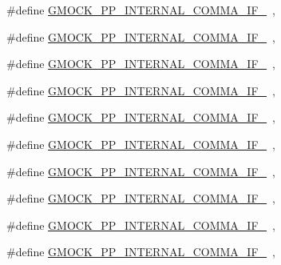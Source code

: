 \begin{DoxyCompactItemize}
\item 
\#define \mbox{\hyperlink{googletest-master_2googlemock_2include_2gmock_2internal_2gmock-pp_8h_a7b531142e60aa3411e6b11c598ee53bf}{G\+M\+O\+C\+K\+\_\+\+P\+P\+\_\+\+I\+N\+T\+E\+R\+N\+A\+L\+\_\+\+C\+O\+M\+M\+A\+\_\+\+I\+F\+\_}}~,
\item 
\#define \mbox{\hyperlink{googletest-master_2googlemock_2include_2gmock_2internal_2gmock-pp_8h_a7f13063361c7eb6017ca649c0efdeec1}{G\+M\+O\+C\+K\+\_\+\+P\+P\+\_\+\+I\+N\+T\+E\+R\+N\+A\+L\+\_\+\+C\+O\+M\+M\+A\+\_\+\+I\+F\+\_}}~,
\item 
\#define \mbox{\hyperlink{googletest-master_2googlemock_2include_2gmock_2internal_2gmock-pp_8h_a3471d8cc6b174ee5440868cb37633aaa}{G\+M\+O\+C\+K\+\_\+\+P\+P\+\_\+\+I\+N\+T\+E\+R\+N\+A\+L\+\_\+\+C\+O\+M\+M\+A\+\_\+\+I\+F\+\_}}~,
\item 
\#define \mbox{\hyperlink{googletest-master_2googlemock_2include_2gmock_2internal_2gmock-pp_8h_a237b21a985a3d7a22539b87c46d53d6f}{G\+M\+O\+C\+K\+\_\+\+P\+P\+\_\+\+I\+N\+T\+E\+R\+N\+A\+L\+\_\+\+C\+O\+M\+M\+A\+\_\+\+I\+F\+\_}}~,
\item 
\#define \mbox{\hyperlink{googletest-master_2googlemock_2include_2gmock_2internal_2gmock-pp_8h_a04c6dbf79411c6c468be3dcef87972b9}{G\+M\+O\+C\+K\+\_\+\+P\+P\+\_\+\+I\+N\+T\+E\+R\+N\+A\+L\+\_\+\+C\+O\+M\+M\+A\+\_\+\+I\+F\+\_}}~,
\item 
\#define \mbox{\hyperlink{googletest-master_2googlemock_2include_2gmock_2internal_2gmock-pp_8h_ab4914950cb2dc462f55a1e069ee9e8e6}{G\+M\+O\+C\+K\+\_\+\+P\+P\+\_\+\+I\+N\+T\+E\+R\+N\+A\+L\+\_\+\+C\+O\+M\+M\+A\+\_\+\+I\+F\+\_}}~,
\item 
\#define \mbox{\hyperlink{googletest-master_2googlemock_2include_2gmock_2internal_2gmock-pp_8h_af15e9b374c945eaac237bd17583ba553}{G\+M\+O\+C\+K\+\_\+\+P\+P\+\_\+\+I\+N\+T\+E\+R\+N\+A\+L\+\_\+\+C\+O\+M\+M\+A\+\_\+\+I\+F\+\_}}~,
\item 
\#define \mbox{\hyperlink{googletest-master_2googlemock_2include_2gmock_2internal_2gmock-pp_8h_a0d8f427b8f338b4157bf81f9989d69e2}{G\+M\+O\+C\+K\+\_\+\+P\+P\+\_\+\+I\+N\+T\+E\+R\+N\+A\+L\+\_\+\+C\+O\+M\+M\+A\+\_\+\+I\+F\+\_}}~,
\item 
\#define \mbox{\hyperlink{googletest-master_2googlemock_2include_2gmock_2internal_2gmock-pp_8h_abf8465b714dfac3a485b3774264a005f}{G\+M\+O\+C\+K\+\_\+\+P\+P\+\_\+\+I\+N\+T\+E\+R\+N\+A\+L\+\_\+\+C\+O\+M\+M\+A\+\_\+\+I\+F\+\_}}~,
\item 
\#define \mbox{\hyperlink{googletest-master_2googlemock_2include_2gmock_2internal_2gmock-pp_8h_a37b278fd32a872c53eb98c886888f442}{G\+M\+O\+C\+K\+\_\+\+P\+P\+\_\+\+I\+N\+T\+E\+R\+N\+A\+L\+\_\+\+C\+O\+M\+M\+A\+\_\+\+I\+F\+\_}}~,

\end{DoxyCompactItemize}
